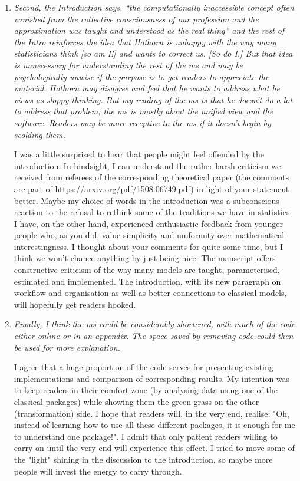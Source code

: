 \documentclass[12pt]{article}
\begin{document}
\begin{enumerate}
\item \textit{Second, the Introduction says, “the computationally inaccessible concept
often vanished from the collective consciousness of our profession and the
approximation was taught and understood as the real thing” and the rest of
the Intro reinforces the idea that Hothorn is unhappy with the way many
statisticians think [so am I!] and wants to correct us.  [So do I.]  But
that idea is unnecessary for understanding the rest of the ms and may be
psychologically unwise if the purpose is to get readers to appreciate the
material.  Hothorn may disagree and feel that he wants to address what he
views as sloppy thinking.  But my reading of the ms is that he doesn’t do a
lot to address that problem; the ms is mostly about the unified view and the
software. Readers may be more receptive to the ms if it doesn’t begin by
scolding them. }

I was a little surprised to hear that people might feel
offended by the introduction. In hindsight, I can understand the rather
harsh criticism we received from referees of the corresponding theoretical
paper (the comments are part of https://arxiv.org/pdf/1508.06749.pdf)
in light of your statement better. Maybe my choice of words in the
introduction was a subconscious reaction to the refusal to rethink some of
the traditions we have in statistics. I have, on the other hand, experienced
enthusiastic feedback from younger people who, as you did, value simplicity
and uniformity over mathematical interestingness. I thought about your
comments for quite some time, but I think we won't chance anything by just
being nice. The manscript offers constructive criticism of the way many
models are taught, parameterised, estimated and implemented. The
introduction, with its new paragraph on workflow and organisation as well as
better connections to classical models, will hopefully get readers
hooked.

\item \textit{Finally, I think the ms could be considerably shortened,
with much of the code either online or in an appendix.  The space saved by
removing code could then be used for more explanation.  }

I agree that a huge proportion of the code serves for presenting existing
implementations and comparison of corresponding results. My intention was to
keep readers in their comfort zone (by analysing data using one of the
classical packages) while showing them the green grass on the other
(transformation) side. I hope that readers will, in the very end, realise:
"Oh, instead of learning how to use all these different packages, it is
enough for me to understand one package!". I admit that only patient readers
willing to carry on until the very end will experience this effect. I tried
to move some of the "light" shining in the discussion to the introduction,
so maybe more people will invest the energy to carry through.

\end{enumerate}
\end{document}

